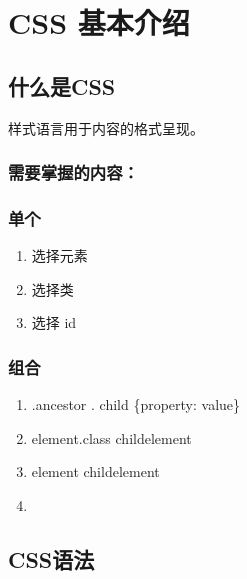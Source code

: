 \documentclass[letterpaper,10pt,english]{sphinxmanual}
\begin{document}
\sphinxstepscope


\chapter{CSS 基本介绍}
\label{\detokenize{XML/css:css}}\label{\detokenize{XML/css::doc}}

\section{什么是CSS}
\label{\detokenize{XML/css:id1}}
\sphinxAtStartPar
样式语言用于内容的格式呈现。


\subsection{需要掌握的内容：}
\label{\detokenize{XML/css:id2}}

\subsection{单个}
\label{\detokenize{XML/css:id3}}\begin{enumerate}
%
\item {} 
\sphinxAtStartPar
选择元素

\item {} 
\sphinxAtStartPar
选择类

\item {} 
\sphinxAtStartPar
选择 id

\end{enumerate}


\subsection{组合}
\label{\detokenize{XML/css:id4}}\begin{enumerate}
%
\item {} 
\sphinxAtStartPar
.ancestor . child \{property: value\}

\item {} 
\sphinxAtStartPar
element.class child\sphinxhyphen{}element

\item {} 
\sphinxAtStartPar
element child\sphinxhyphen{}element

\item {} 
\end{enumerate}


\section{CSS语法}
\label{\detokenize{XML/css:id5}}
\sphinxAtStartPar
{}
\end{document}
